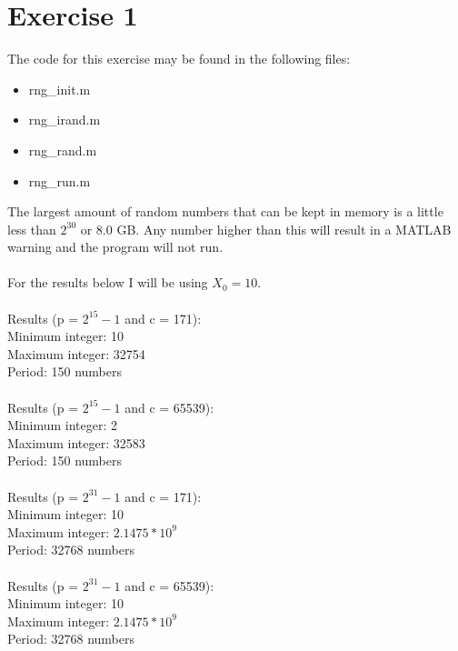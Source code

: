 \section*{Exercise 1}
The code for this exercise may be found in the following files:
\begin{itemize}
	\item rng\_init.m
	\item rng\_irand.m
	\item rng\_rand.m
	\item rng\_run.m	
\end{itemize}
The largest amount of random numbers that can be kept in memory is a little less than $2^{30}$ or 8.0 GB. Any number higher than this will result in a MATLAB warning and the program will not run.\\\\
For the results below I will be using $X_{0}=10$.\\\\
Results (p = $2^{15} - 1$ and c = 171):\\
Minimum integer: 10\\
Maximum integer: 32754\\
Period: 150 numbers\\\\
Results (p = $2^{15} - 1$ and c = 65539):\\
Minimum integer: 2\\
Maximum integer: 32583\\
Period: 150 numbers\\\\
Results (p = $2^{31} - 1$ and c = 171):\\
Minimum integer: 10\\
Maximum integer: $2.1475 * 10^{9}$\\
Period: 32768 numbers\\\\
Results (p = $2^{31} - 1$ and c = 65539):\\
Minimum integer: 10\\
Maximum integer: $2.1475 * 10^{9}$\\
Period: 32768 numbers\\\\
